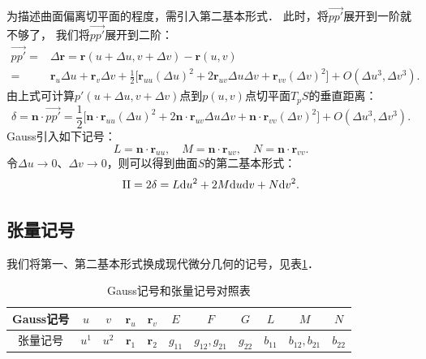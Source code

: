 为描述曲面偏离切平面的程度，需引入第二基本形式．
此时，将$\overrightarrow{pp'}$展开到一阶就不够了，
我们将$\overrightarrow{pp'}$展开到二阶：
\begin{align*}
    \overrightarrow{pp'}=&\Delta \boldsymbol{r} =\boldsymbol{r}(u+\Delta u, v+\Delta v) - \boldsymbol{r}(u,v) \\
    =& \boldsymbol{r}_u \Delta u + \boldsymbol{r}_v \Delta v + \frac{1}{2}\bigl[
    \boldsymbol{r}_{uu} (\Delta u)^2 +2\boldsymbol{r}_{uv} \Delta u \Delta v +\boldsymbol{r}_{vv} (\Delta v)^2 \bigr]
    + O(\Delta u^3, \Delta v^3).
\end{align*}
由上式可计算$p'(u+\Delta u, v+\Delta v)$点到$p(u,v)$点切平面$T_pS$的垂直距离：
\begin{equation*}
    \delta = \boldsymbol{n}\cdot \overrightarrow{pp'} = \frac{1}{2}\bigl[
    \boldsymbol{n}\cdot\boldsymbol{r}_{uu} (\Delta u)^2 +2\boldsymbol{n}\cdot\boldsymbol{r}_{uv} \Delta u \Delta v
     +\boldsymbol{n}\cdot\boldsymbol{r}_{vv} (\Delta v)^2 \bigr] + O(\Delta u^3, \Delta v^3).
\end{equation*}
Gauss引入如下记号：
\begin{equation}
    L= \boldsymbol{n}\cdot\boldsymbol{r}_{uu},\quad M= \boldsymbol{n}\cdot\boldsymbol{r}_{uv},
    \quad N=\boldsymbol{n}\cdot\boldsymbol{r}_{vv} .
\end{equation}
令$\Delta u\to 0$、$\Delta v\to 0$，则可以得到曲面$S$的{\heiti 第二基本形式}：
\begin{equation}\label{chcdg:eqn_IIform}
    {\rm II}=2\delta = L {\rm d}u^2 + 2M {\rm d}u {\rm d}v + N {\rm d}v^2 .
\end{equation}

\subsection{张量记号}
我们将第一、第二基本形式换成现代微分几何的记号，见表\ref{chcdg:tab-gauss-tensor}．

\begin{table}[htb]
    \centering
    \caption{Gauss记号和张量记号对照表} \label{chcdg:tab-gauss-tensor}
    \begin{tabular}{|*{11}{c|}}
        \hline 
        Gauss记号 & $u$   &  $v$  & $\boldsymbol{r}_u$  & $\boldsymbol{r}_v$ & $E$ & $F$ & $G$ & $L$ & $M$ & $N$ \\
        \hline
        张量记号  & $u^1$ & $u^2$ & $\boldsymbol{r}_1$ & $\boldsymbol{r}_2$ & $g_{11}$ & $g_{12},g_{21}$ & $g_{22}$ 
         & $b_{11}$ & $b_{12},b_{21}$ & $b_{22}$     \\ 
        \hline
    \end{tabular}
\end{table}


